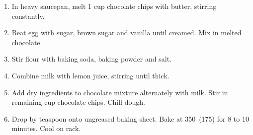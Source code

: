 
\begin{ingredients}
\end{ingredients}


\begin{recipe}
  \begin{enumerate}
  \item In heavy saucepan, melt 1 cup chocolate chips with butter, stirring
    constantly.

  \item Beat egg with sugar, brown sugar and vanilla until
    creamed.  Mix in melted chocolate.

  \item Stir flour with baking soda,
    baking powder and salt.

  \item Combine milk with lemon juice, stirring
    until thick.

  \item Add dry ingredients to chocolate mixture alternately
    with milk.  Stir in remaining cup chocolate chips.  Chill
    dough.

  \item Drop by teaspoon onto ungreased baking sheet.  Bake at 350\F\ (175\C)
    for 8 to 10 minutes.  Cool on rack.
    
  \end{enumerate}
\end{recipe}

